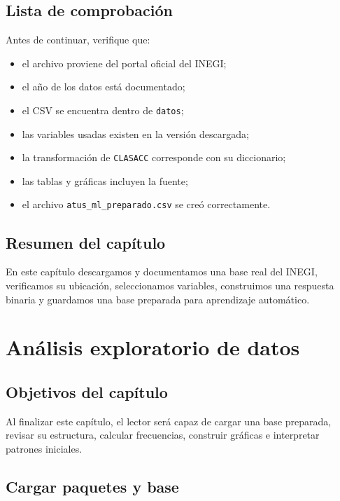 \documentclass[
  spanish,
  10.5pt,
  letterpaper,
  openany,
  headings=big]{scrbook}
\providecommand{\tightlist}{%
  \setlength{\itemsep}{0pt}\setlength{\parskip}{0pt}}
\begin{document}
\section{Lista de comprobación}\label{lista-de-comprobaciuxf3n}

Antes de continuar, verifique que:

\begin{itemize}
\tightlist
\item
  el archivo proviene del portal oficial del INEGI;
\item
  el año de los datos está documentado;
\item
  el CSV se encuentra dentro de \texttt{datos};
\item
  las variables usadas existen en la versión descargada;
\item
  la transformación de \texttt{CLASACC} corresponde con su diccionario;
\item
  las tablas y gráficas incluyen la fuente;
\item
  el archivo \texttt{atus\_ml\_preparado.csv} se creó correctamente.
\end{itemize}

\section{Resumen del capítulo}\label{resumen-del-capuxedtulo}

En este capítulo descargamos y documentamos una base real del INEGI,
verificamos su ubicación, seleccionamos variables, construimos una
respuesta binaria y guardamos una base preparada para aprendizaje
automático.


\chapter{Análisis exploratorio de
datos}\label{anuxe1lisis-exploratorio-de-datos}

\section{Objetivos del capítulo}\label{objetivos-del-capuxedtulo-2}

Al finalizar este capítulo, el lector será capaz de cargar una base
preparada, revisar su estructura, calcular frecuencias, construir
gráficas e interpretar patrones iniciales.

\section{Cargar paquetes y base}\label{cargar-paquetes-y-base}
\end{document}
